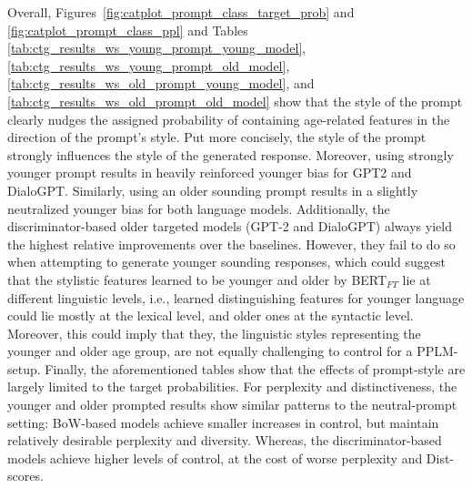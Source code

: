 Overall, Figures~\ref{fig:catplot_prompt_class_target_prob} and \ref{fig:catplot_prompt_class_ppl} and Tables \ref{tab:ctg_results_ws_young_prompt_young_model}, \ref{tab:ctg_results_ws_young_prompt_old_model}, \ref{tab:ctg_results_ws_old_prompt_young_model}, and \ref{tab:ctg_results_ws_old_prompt_old_model} show that the style of the prompt clearly nudges the assigned probability of containing age-related features in the direction of the prompt's style. Put more concisely, the style of the prompt strongly influences the style of the generated response. Moreover, using strongly younger prompt results in heavily reinforced younger bias for GPT2 and DialoGPT. Similarly, using an older sounding prompt results in a slightly neutralized younger bias for both language models. Additionally, the discriminator-based older targeted models (GPT-2 and DialoGPT) always yield the highest relative improvements over the baselines. However, they fail to do so when attempting to generate younger sounding responses, which could suggest that the stylistic features learned to be younger and older by BERT$_{FT}$ lie at different linguistic levels, i.e., learned distinguishing features for younger language could lie mostly at the lexical level, and older ones at the syntactic level. Moreover, this could imply that they, the linguistic styles representing the younger and older age group, are not equally challenging to control for a PPLM-setup. Finally, the aforementioned tables show that the effects of prompt-style are largely limited to the target probabilities. For perplexity and distinctiveness, the younger and older prompted results show similar patterns to the neutral-prompt setting: BoW-based models achieve smaller increases in control, but maintain relatively desirable perplexity and diversity. Whereas, the discriminator-based models achieve higher levels of control, at the cost of worse perplexity and Dist-scores.


